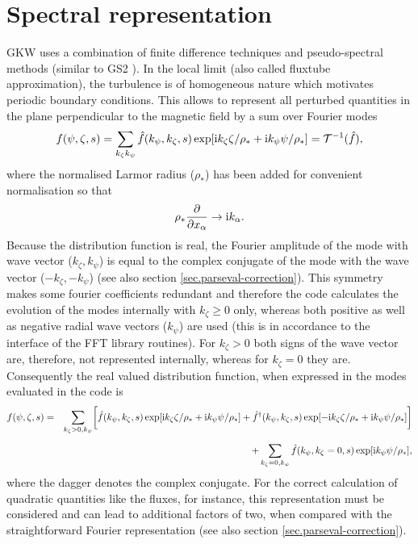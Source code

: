 \section{Spectral representation}
\label{sec:spectral}
GKW uses a combination of finite difference techniques and
pseudo-spectral methods (similar to GS2 \cite{KOT95,DOR00}).  In the
local limit (also called fluxtube approximation), the turbulence is of
homogeneous nature which motivates periodic boundary conditions. This
allows to represent all perturbed quantities in the plane
perpendicular to the magnetic field by a sum over
Fourier modes 
\begin{equation}
\label{eq:local-limit}
f(\psi,\zeta,s) = \sum_{k_\zeta k_\psi} \hat f (k_\psi, k_\zeta,s) \exp [ {\rm i} k_\zeta  \zeta /\rho_* + {\rm i} k_\psi  \psi / \rho_* ] = {\mathcal T}^{-1}(\hat f),
\end{equation}
where the normalised Larmor radius ($\rho_*$) has been added for convenient normalisation so that
\begin{equation}
\rho_* \frac{\partial }{\partial x_\alpha} \rightarrow {\rm i} k_\alpha .
\end{equation}
Because the distribution function is real, the Fourier amplitude of
the mode with wave vector ($k_\zeta, k_\psi$) is equal to the complex
conjugate of the mode with the wave vector ($-k_\zeta, -k_\psi$) (see
also section \ref{sec.parseval-correction}). This symmetry makes some
fourier coefficients redundant and therefore the code calculates the
evolution of the modes internally with $k_\zeta \geq 0$ only, whereas
both positive as well as negative radial wave vectors ($k_\psi$) are
used (this is in accordance to the interface of the FFT library
routines). For $k_\zeta > 0$ both signs of the wave vector are,
therefore, not represented internally, whereas for $k_\zeta = 0$ they
are. Consequently the real valued distribution function, when
expressed in the modes evaluated in the code is
\begin{eqnarray} 
f(\psi,\zeta,s) &=& \sum_{k_\zeta>0, k_\psi}  \biggl [ \hat f (k_\psi, k_\zeta,s) \exp [ {\rm i} k_\zeta  \zeta /\rho_* + {\rm i} k_\psi  \psi / \rho_* ]  + 
\hat f^\dagger (k_\psi, k_\zeta,s) \exp [ -{\rm i} k_\zeta  \zeta /\rho_* + {\rm i} k_\psi  \psi / \rho_* ] \biggr ] \cr 
\noalign{\vskip 0.2 truecm}
& & + \sum_{k_\zeta = 0, k_\psi}  \hat f (k_\psi, k_\zeta = 0,s) \exp [  {\rm i} k_\psi  \psi / \rho_* ], 
\end{eqnarray}
where the dagger denotes the complex conjugate. 
For the correct calculation of quadratic quantities like the fluxes, for instance, this representation must be considered and can lead to additional 
factors of two, when compared with the straightforward Fourier representation (see also section \ref{sec.parseval-correction}).

